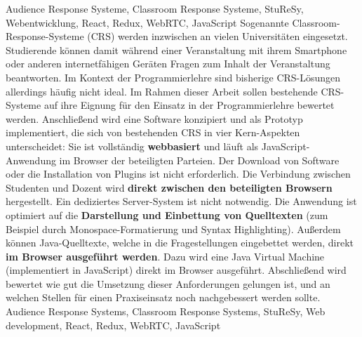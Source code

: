 \documentclass[draft=false
              ,paper=a4
              ,twoside=false
              ,fontsize=11pt
              ,headsepline
              ,BCOR=10mm
              ]{scrbook}
\begin{document}
\HAWAbstractPage
{Audience Response Systeme, Classroom Response Systeme, StuReSy, Webentwicklung, React, Redux, WebRTC, JavaScript}
{Sogenannte Classroom-Response-Systeme (CRS) werden inzwischen an vielen Universitäten eingesetzt. Studierende können damit während einer Veranstaltung mit ihrem Smartphone oder anderen internetfähigen Geräten Fragen zum Inhalt der Veranstaltung beantworten. Im Kontext der Programmierlehre sind bisherige CRS-Lösungen allerdings häufig nicht ideal. Im Rahmen dieser Arbeit sollen bestehende CRS-Systeme auf ihre Eignung für den Einsatz in der Programmierlehre bewertet werden. Anschließend wird eine Software konzipiert und als Prototyp implementiert, die sich von bestehenden CRS in vier Kern-Aspekten unterscheidet:\newline
Sie ist vollständig \textbf{webbasiert} und läuft als JavaScript-Anwendung im Browser der beteiligten Parteien. Der Download von Software oder die Installation von Plugins ist nicht erforderlich.\newline
Die Verbindung zwischen Studenten und Dozent wird \textbf{direkt zwischen den beteiligten Browsern} hergestellt. Ein dediziertes Server-System ist nicht notwendig.\newline
Die Anwendung ist optimiert auf die \textbf{Darstellung und Einbettung von Quelltexten} (zum Beispiel durch Monospace-Formatierung und Syntax Highlighting).\newline
Außerdem können Java-Quelltexte, welche in die Fragestellungen eingebettet werden, direkt \textbf{im Browser ausgeführt werden}. Dazu wird eine Java Virtual Machine (implementiert in JavaScript) direkt im Browser ausgeführt.\newline
Abschließend wird bewertet wie gut die Umsetzung dieser Anforderungen gelungen ist, und an welchen Stellen für einen Praxiseinsatz noch nachgebessert werden sollte.}
{Audience Response Systems, Classroom Response Systems, StuReSy, Web development, React, Redux, WebRTC, JavaScript}
\end{document}
